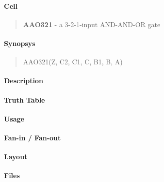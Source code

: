 \label{AAO321}
\paragraph{Cell}
\begin{quote}
    \textbf{AAO321} - a 3-2-1-input AND-AND-OR gate
\end{quote}

\paragraph{Synopsys}
\begin{quote}
    AAO321(Z, C2, C1, C, B1, B, A)
\end{quote}

\paragraph{Description}

%

\paragraph{Truth Table}
%

\paragraph{Usage}

\paragraph{Fan-in / Fan-out}

\paragraph{Layout}

\paragraph{Files}
